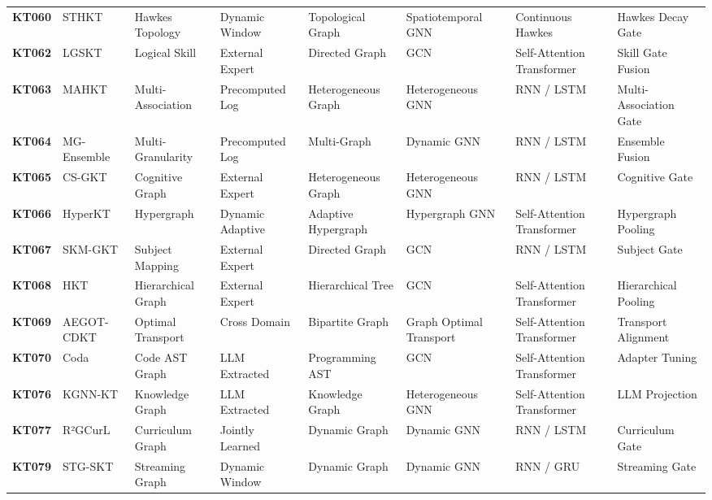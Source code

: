 \documentclass[10pt,journal,compsoc]{IEEEtran}
\begin{document}
\begin{table}[t]
{\begin{tabular}{llllllll}
\textbf{KT060} & STHKT \cite{KT060_STHKT_2025} & Hawkes Topology & Dynamic Window & Topological Graph & Spatiotemporal GNN & Continuous Hawkes & Hawkes Decay Gate \\
\textbf{KT062} & LGSKT \cite{KT062_LGSKT_2025} & Logical Skill & External Expert & Directed Graph & GCN & Self-Attention Transformer & Skill Gate Fusion \\
\textbf{KT063} & MAHKT \cite{KT063_MAHKT_2025} & Multi-Association & Precomputed Log & Heterogeneous Graph & Heterogeneous GNN & RNN / LSTM & Multi-Association Gate \\
\textbf{KT064} & MG-Ensemble \cite{KT064_MGEnsemble_2025} & Multi-Granularity & Precomputed Log & Multi-Graph & Dynamic GNN & RNN / LSTM & Ensemble Fusion \\
\textbf{KT065} & CS-GKT \cite{KT065_CSGKT_2025} & Cognitive Graph & External Expert & Heterogeneous Graph & Heterogeneous GNN & RNN / LSTM & Cognitive Gate \\
\textbf{KT066} & HyperKT \cite{KT066_HyperKT_2025} & Hypergraph & Dynamic Adaptive & Adaptive Hypergraph & Hypergraph GNN & Self-Attention Transformer & Hypergraph Pooling \\
\textbf{KT067} & SKM-GKT \cite{KT067_SKMGKT_2025} & Subject Mapping & External Expert & Directed Graph & GCN & RNN / LSTM & Subject Gate \\
\textbf{KT068} & HKT \cite{KT068_HKT_2025} & Hierarchical Graph & External Expert & Hierarchical Tree & GCN & Self-Attention Transformer & Hierarchical Pooling \\
\textbf{KT069} & AEGOT-CDKT \cite{KT069_AEGOTCDKT_2025} & Optimal Transport & Cross Domain & Bipartite Graph & Graph Optimal Transport & Self-Attention Transformer & Transport Alignment \\
\textbf{KT070} & Coda \cite{KT070_Coda_2025} & Code AST Graph & LLM Extracted & Programming AST & GCN & Self-Attention Transformer & Adapter Tuning \\
\textbf{KT076} & KGNN-KT \cite{KT076_KGNNKT_2025} & Knowledge Graph & LLM Extracted & Knowledge Graph & Heterogeneous GNN & Self-Attention Transformer & LLM Projection \\
\textbf{KT077} & R²GCurL \cite{KT077_R2GCurL_2026} & Curriculum Graph & Jointly Learned & Dynamic Graph & Dynamic GNN & RNN / LSTM & Curriculum Gate \\
\textbf{KT079} & STG-SKT \cite{KT079_STGSKT_2026} & Streaming Graph & Dynamic Window & Dynamic Graph & Dynamic GNN & RNN / GRU & Streaming Gate \\
\bottomrule
\end{tabular}
}
\end{table}
\end{document}
